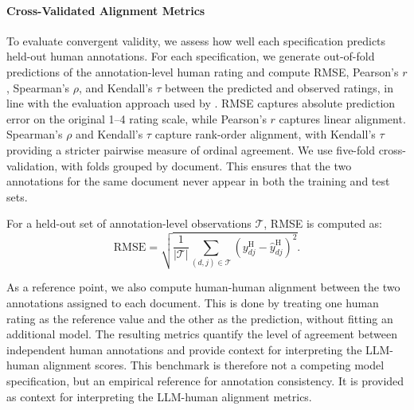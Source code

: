 \paragraph{Cross-Validated Alignment Metrics}

To evaluate convergent validity, we assess how well each specification predicts held-out human annotations. For each specification, we generate out-of-fold predictions of the annotation-level human rating and compute RMSE, Pearson's $r$, Spearman's $\rho$, and Kendall's $\tau$ between the predicted and observed ratings, in line with the evaluation approach used by \citet{hashemi_llm-rubric_2024}. RMSE captures absolute prediction error on the original 1--4 rating scale, while Pearson's $r$ captures linear alignment. Spearman's $\rho$ and Kendall's $\tau$ capture rank-order alignment, with Kendall's $\tau$ providing a stricter pairwise measure of ordinal agreement. We use five-fold cross-validation, with folds grouped by document. This ensures that the two annotations for the same document never appear in both the training and test sets.

For a held-out set of annotation-level observations $\mathcal{T}$, RMSE is computed as:
\begin{equation}
    \text{RMSE} =
    \sqrt{
    \frac{1}{|\mathcal{T}|}
    \sum_{(d,j) \in \mathcal{T}}
    \left(y^{\text{H}}_{dj} - \hat{y}^{\text{H}}_{dj}\right)^2
    }.
\end{equation}

As a reference point, we also compute human-human alignment between the two annotations assigned to each document. This is done by treating one human rating as the reference value and the other as the prediction, without fitting an additional model. The resulting metrics quantify the level of agreement between independent human annotations and provide context for interpreting the LLM-human alignment scores. This benchmark is therefore not a competing model specification, but an empirical reference for annotation consistency. It is provided as context for interpreting the LLM-human alignment metrics.




